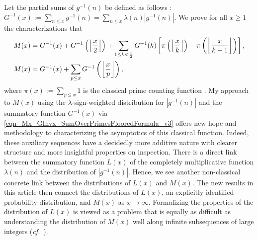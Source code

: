 \documentclass[10pt,reqno,letterpaper]{article}
\theoremstyle{plain}
\numberwithin{theorem}{section}
\theoremstyle{definition}
\newcommand{\cf}[0]{\emph{cf.}\ }
\newcommand{\Floor}[2]{\ensuremath{\left\lfloor \frac{#1}{#2} \right\rfloor}}
\newcommand{\seqnum}[1]{\href{http://oeis.org/#1}{\color{Gray!50!Black}{\underline{#1}}}}
\begin{document}
Let the partial sums of $g^{-1}(n)$ be defined as follows 
\cite[\seqnum{A341472}]{OEIS}: 
$G^{-1}(x) := \sum_{n \leq x} g^{-1}(n) = \sum_{n \leq x} \lambda(n) |g^{-1}(n)|$. 
We prove for all $x \geq 1$ the characterizations that 
\begin{align}
\notag 
M(x) & = G^{-1}(x) + G^{-1}\left(\Floor{x}{2}\right) + 
     \sum_{1 \leq k < \frac{x}{2}} G^{-1}(k) \left[ 
     \pi\left(\Floor{x}{k}\right) - \pi\left(\Floor{x}{k+1}\right) 
     \right], \\ 
\label{eqn_Mx_GInvx_SumOverPrimesFlooredFormula_v3} 
M(x) & = G^{-1}(x) + \sum_{\substack{p \leq x}} G^{-1}\left(\Floor{x}{p}\right), 
\end{align}
where $\pi(x) := \sum_{p \leq x} 1$ is the classical prime counting function \cite[\seqnum{A000720}]{OEIS}. 
My approach to $M(x)$ using the $\lambda$-sign-weighted distribution for $|g^{-1}(n)|$ and the 
summatory function $G^{-1}(x)$ via 
\eqref{eqn_Mx_GInvx_SumOverPrimesFlooredFormula_v3} 
offers new hope and methodology to characterizing the asymptotics of this classical function. 
Indeed, these auxiliary sequences have a decidedly more additive nature with clearer structure and 
more insightful properties on inspection. 
There is a direct link between 
the summatory function $L(x)$ of the completely multiplicative function 
$\lambda(n)$ and the distribution of 
$|g^{-1}(n)|$. Hence, we see another non-classical 
concrete link between the distributions of $L(x)$ and $M(x)$. 
The new results in this article then 
connect the distributions of $L(x)$, an explicitly identified 
probability distribution, and $M(x)$ as $x \rightarrow \infty$.
Formalizing the properties of the distribution of 
$L(x)$ is viewed as a problem that is equally as difficult 
as understanding the distribution of $M(x)$ well along infinite 
subsequences of large integers 
(\cf \cite{HUMPHRIES-JNT-2013}). 
\end{document}
